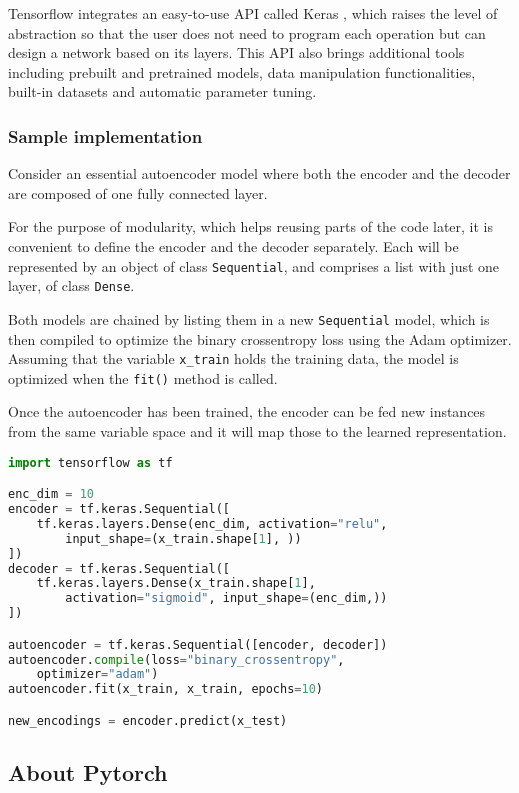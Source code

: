 Tensorflow integrates an easy-to-use API called Keras , which raises the level of abstraction so that the user does not need to program each operation but can design a network based on its layers. This API also brings additional tools including prebuilt and pretrained models, data manipulation functionalities, built-in datasets and automatic parameter tuning.

\subsubsection{Sample implementation}

Consider an essential autoencoder model where both the encoder and the decoder are composed of one fully connected layer. 

For the purpose of modularity, which helps reusing parts of the code later, it is convenient to define the encoder and the decoder separately. Each will be represented by an object of class \texttt{Sequential}, and comprises a list with just one layer, of class \texttt{Dense}. 

Both models are chained by listing them in a new \texttt{Sequential} model, which is then compiled to optimize the binary crossentropy loss using the Adam  optimizer. Assuming that the variable \texttt{x\_train} holds the training data, the model is optimized when the \texttt{fit()} method is called.

Once the autoencoder has been trained, the encoder can be fed new instances from the same variable space and it will map those to the learned representation.

\begin{lstlisting}[language=Python]
import tensorflow as tf

enc_dim = 10
encoder = tf.keras.Sequential([
    tf.keras.layers.Dense(enc_dim, activation="relu", 
        input_shape=(x_train.shape[1], ))
])
decoder = tf.keras.Sequential([
    tf.keras.layers.Dense(x_train.shape[1], 
        activation="sigmoid", input_shape=(enc_dim,))
])

autoencoder = tf.keras.Sequential([encoder, decoder])
autoencoder.compile(loss="binary_crossentropy", 
    optimizer="adam")
autoencoder.fit(x_train, x_train, epochs=10)

new_encodings = encoder.predict(x_test)
\end{lstlisting}

\subsection{About Pytorch}

